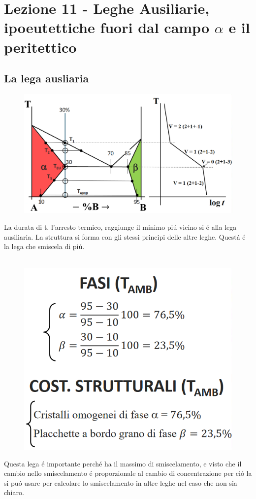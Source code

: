 \documentclass{article}
\begin{document}
{    \section{Lezione 11 - Leghe Ausiliarie, ipoeutettiche fuori dal campo $\alpha$ e il peritettico}
        \subsection{La lega ausliaria}
            \begin{figure}[h!]
                \centering
                \includegraphics[width=.85\linewidth]{Diagramma di stato di parziale solubilita per lega ipoeutettica dopo campo a e traiettoria.png}
            \end{figure}
            La durata di t, l'arresto termico, raggiunge il minimo pi\'u vicino si \'e alla lega ausiliaria. La struttura si forma con gli stessi principi delle altre leghe. Quest\'a \'e la lega che smiscela di pi\'u.\\ \\
            \begin{figure}[h!]
                \centering
                \includegraphics[width=.70\linewidth]{Calcolo per la lega ausiliaria per materiali parzialmente miscibile.png}
            \end{figure}
            Questa lega \'e importante perch\'e ha il massimo di smiscelamento, e visto che il cambio nello smiscelamento \'e proporzionale al cambio di concentrazione per ci\'o la si pu\'o usare per calcolare lo smiscelamento in altre leghe nel caso che non sia chiaro.
}
\end{document}

